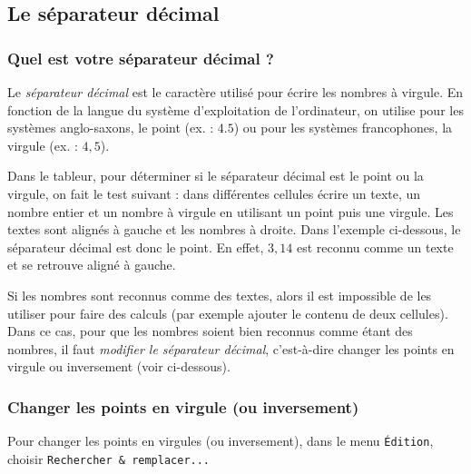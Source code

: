 \subsection{Le séparateur décimal}\label{Calc3sepDec}

\subsubsection{Quel est votre séparateur décimal ?}

Le \emph{séparateur décimal} est le caractère utilisé pour écrire les nombres à virgule. En fonction de la langue du système d'exploitation de l'ordinateur, on utilise pour les systèmes anglo-saxons, le point (ex. : $4.5$) ou pour les systèmes francophones, la virgule (ex. : $4,5$).

\vspace{6pt}

Dans le tableur, pour déterminer si le séparateur décimal est le point ou la virgule, on fait le test suivant : dans différentes cellules écrire un texte, un nombre entier et un nombre à virgule en utilisant un point puis une virgule. Les textes sont alignés à gauche et les nombres à droite. Dans l'exemple ci-dessous, le séparateur décimal est donc le point. En effet, $3,14$ est reconnu comme un texte et se retrouve aligné à gauche.


Si les nombres sont reconnus comme des textes, alors il est impossible de les utiliser pour faire des calculs (par exemple ajouter le contenu de deux cellules). Dans ce cas, pour que les nombres soient bien reconnus comme étant des nombres, il faut \emph{modifier le séparateur décimal}, c'est-à-dire changer les points en virgule ou inversement (voir ci-dessous).

\subsubsection{Changer les points en virgule (ou inversement)}

Pour changer les points en virgules (ou inversement), dans le menu \texttt{Édition}, choisir \texttt{Rechercher \& remplacer...}


